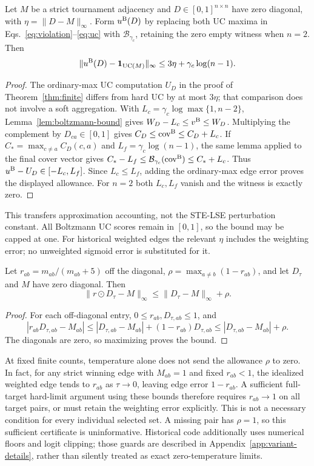 \begin{corollary}\label{cor:boltzmann-uc}
Let $M$ be a strict tournament adjacency and $D\in[0,1]^{n\times n}$ have zero diagonal, with $\eta=\|D-M\|_\infty$. Form $u^{\rm B}(D)$ by replacing both UC maxima in Eqs.~\eqref{eq:violation}--\eqref{eq:uc} with $\mathcal B_{\gamma_c}$, retaining the zero empty witness when $n=2$. Then
\[
\|u^{\rm B}(D)-\mathbf1_{\mathrm{UC}(M)}\|_\infty\le3\eta+\gamma_c\log(n-1).
\]
\end{corollary}
\begin{proof}
The ordinary-max UC computation $U_D$ in the proof of Theorem~\ref{thm:finite} differs from hard UC by at most $3\eta$; that comparison does not involve a soft aggregation. With $L_c=\gamma_c\log\max\{1,n-2\}$, Lemma~\ref{lem:boltzmann-bound} gives $W_D-L_c\le v^{\rm B}\le W_D$. Multiplying the complement by $D_{ca}\in[0,1]$ gives $C_D\le\operatorname{cov}^{\rm B}\le C_D+L_c$. If $C_* = \max_{c\ne a}C_D(c,a)$ and $L_f=\gamma_c\log(n-1)$, the same lemma applied to the final cover vector gives
$C_*-L_f\le\mathcal B_{\gamma_c}(\operatorname{cov}^{\rm B})\le C_*+L_c$.
Thus $u^{\rm B}-U_D\in[-L_c,L_f]$. Since $L_c\le L_f$, adding the ordinary-max edge error proves the displayed allowance. For $n=2$ both $L_c,L_f$ vanish and the witness is exactly zero.
\end{proof}
This transfers approximation accounting, not the STE-LSE perturbation constant. All Boltzmann UC scores remain in $[0,1]$, so the bound may be capped at one. For historical weighted edges the relevant $\eta$ includes the weighting error; no unweighted sigmoid error is substituted for it.

\begin{lemma}\label{lem:weighted-edge-bound}
Let $r_{ab}=m_{ab}/(m_{ab}+5)$ off the diagonal, $\rho=\max_{a\ne b}(1-r_{ab})$, and let $D_\tau$ and $M$ have zero diagonal. Then
\[
\|r\odot D_\tau-M\|_\infty\le\|D_\tau-M\|_\infty+\rho.
\]
\end{lemma}
\begin{proof}
For each off-diagonal entry, $0\le r_{ab},D_{\tau,ab}\le1$, and
\[
|r_{ab}D_{\tau,ab}-M_{ab}|
\le |D_{\tau,ab}-M_{ab}|+(1-r_{ab})D_{\tau,ab}
\le |D_{\tau,ab}-M_{ab}|+\rho.
\]
The diagonals are zero, so maximizing proves the bound.
\end{proof}
At fixed finite counts, temperature alone does not send the allowance $\rho$ to zero. In fact, for any strict winning edge with $M_{ab}=1$ and fixed $r_{ab}<1$, the idealized weighted edge tends to $r_{ab}$ as $\tau\to0$, leaving edge error $1-r_{ab}$. A sufficient full-target hard-limit argument using these bounds therefore requires $r_{ab}\to1$ on all target pairs, or must retain the weighting error explicitly. This is not a necessary condition for every individual selected set. A missing pair has $\rho=1$, so this sufficient certificate is uninformative. Historical code additionally uses numerical floors and logit clipping; those guards are described in Appendix~\ref{app:variant-details}, rather than silently treated as exact zero-temperature limits.

